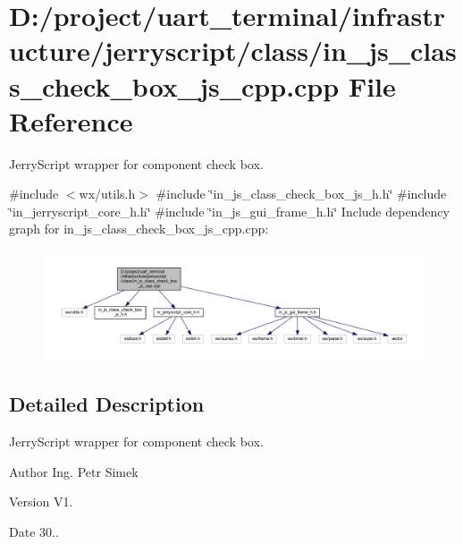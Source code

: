 \section{D\+:/project/uart\+\_\+terminal/infrastructure/jerryscript/class/in\+\_\+js\+\_\+class\+\_\+check\+\_\+box\+\_\+js\+\_\+cpp.cpp File Reference}
\label{in__js__class__check__box__js__cpp_8cpp}


Jerry\+Script wrapper for component check box.  


{\ttfamily \#include $<$wx/utils.\+h$>$}\newline
{\ttfamily \#include \char`\"{}in\+\_\+js\+\_\+class\+\_\+check\+\_\+box\+\_\+js\+\_\+h.\+h\char`\"{}}\newline
{\ttfamily \#include \char`\"{}in\+\_\+jerryscript\+\_\+core\+\_\+h.\+h\char`\"{}}\newline
{\ttfamily \#include \char`\"{}in\+\_\+js\+\_\+gui\+\_\+frame\+\_\+h.\+h\char`\"{}}\newline
Include dependency graph for in\+\_\+js\+\_\+class\+\_\+check\+\_\+box\+\_\+js\+\_\+cpp.\+cpp\+:\nopagebreak
\begin{figure}[H]
\begin{center}
\leavevmode
\includegraphics[width=350pt]{in__js__class__check__box__js__cpp_8cpp__incl}
\end{center}
\end{figure}


\subsection{Detailed Description}
Jerry\+Script wrapper for component check box. 

\begin{DoxyAuthor}{Author}
Ing. Petr Simek 
\end{DoxyAuthor}
\begin{DoxyVersion}{Version}
V1. 
\end{DoxyVersion}
\begin{DoxyDate}{Date}
30.. 
\end{DoxyDate}

